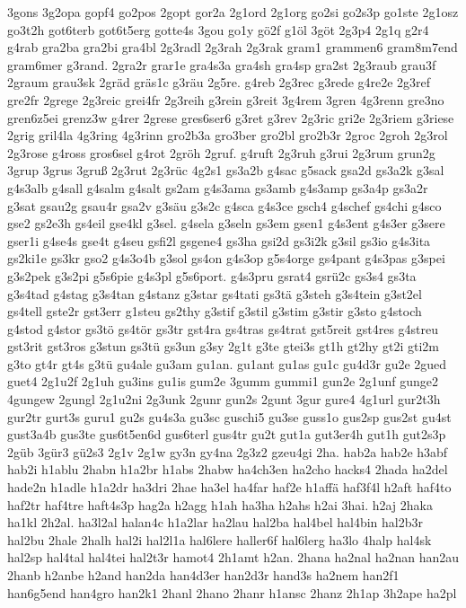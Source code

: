 {3gons
3g2opa
gopf4
go2pos
2gopt
gor2a
2g1ord
2g1org
go2si
go2s3p
go1ste
2g1osz
go3t2h
got6terb
got6t5erg
gotte4s
3gou
go1y
gö2f
g1öl
3göt
2g3p4
2g1q
g2r4
g4rab
gra2ba
gra2bi
gra4bl
2g3radl
2g3rah
2g3rak
gram1
grammen6
gram8m7end
gram6mer
g3rand.
2gra2r
grar1e
gra4s3a
gra4sh
gra4sp
gra2st
2g3raub
grau3f
2graum
grau3sk
2gräd
gräs1c
g3räu
2g5re.
g4reb
2g3rec
g3rede
g4re2e
2g3ref
gre2fr
2grege
2g3reic
grei4fr
2g3reih
g3rein
g3reit
3g4rem
3gren
4g3renn
gre3no
gren6z5ei
grenz3w
g4rer
2grese
gres6ser6
g3ret
g3rev
2g3ric
gri2e
2g3riem
g3riese
2grig
gril4la
4g3ring
4g3rinn
gro2b3a
gro3ber
gro2bl
gro2b3r
2groc
2groh
2g3rol
2g3rose
g4ross
gros6sel
g4rot
2gröh
2gruf.
g4ruft
2g3ruh
g3rui
2g3rum
grun2g
3grup
3grus
3gruß
2g3rut
2g3rüc
4g2s1
gs3a2b
g4sac
g5sack
gsa2d
gs3a2k
g3sal
g4s3alb
g4sall
g4salm
g4salt
gs2am
g4s3ama
gs3amb
g4s3amp
gs3a4p
gs3a2r
g3sat
gsau2g
gsau4r
gsa2v
g3säu
g3s2c
g4sca
g4s3ce
gsch4
g4schef
gs4chi
g4sco
gse2
gs2e3h
gs4eil
gse4kl
g3sel.
g4sela
g3seln
gs3em
gsen1
g4s3ent
g4s3er
g3sere
gser1i
g4se4s
gse4t
g4seu
gsfi2l
gsgene4
gs3ha
gsi2d
gs3i2k
g3sil
gs3io
g4s3ita
gs2ki1e
gs3kr
gso2
g4s3o4b
g3sol
gs4on
g4s3op
g5s4orge
gs4pant
g4s3pas
g3spei
g3s2pek
g3s2pi
g5s6pie
g4s3pl
g5s6port.
g4s3pru
gsrat4
gsrü2c
gs3s4
gs3ta
g3s4tad
g4stag
g3s4tan
g4stanz
g3star
gs4tati
gs3tä
g3steh
g3s4tein
g3st2el
gs4tell
gste2r
gst3err
g1steu
gs2thy
g3stif
g3stil
g3stim
g3stir
g3sto
g4stoch
g4stod
g4stor
gs3tö
gs4tör
gs3tr
gst4ra
gs4tras
gs4trat
gst5reit
gst4res
g4streu
gst3rit
gst3ros
g3stun
gs3tü
gs3un
g3sy
2g1t
g3te
gtei3s
gt1h
gt2hy
gt2i
gti2m
g3to
gt4r
gt4s
g3tü
gu4ale
gu3am
gu1an.
gu1ant
gu1as
gu1c
gu4d3r
gu2e
2gued
guet4
2g1u2f
2g1uh
gu3ins
gu1is
gum2e
3gumm
gummi1
gun2e
2g1unf
gunge2
4gungew
2gungl
2g1u2ni
2g3unk
2gunr
gun2s
2gunt
3gur
gure4
4g1url
gur2t3h
gur2tr
gurt3s
guru1
gu2s
gu4s3a
gu3sc
guschi5
gu3se
guss1o
gus2sp
gus2st
gu4st
gust3a4b
gus3te
gus6t5en6d
gus6terl
gus4tr
gu2t
gut1a
gut3er4h
gut1h
gut2s3p
2güb
3gür3
gü2s3
2g1v
2g1w
gy3n
gy4na
2g3z2
gzeu4gi
2ha.
hab2a
hab2e
h3abf
hab2i
h1ablu
2habn
h1a2br
h1abs
2habw
ha4ch3en
ha2cho
hacks4
2hada
ha2del
hade2n
h1adle
h1a2dr
ha3dri
2hae
ha3el
ha4far
haf2e
h1affä
haf3f4l
h2aft
haf4to
haf2tr
haf4tre
haft4s3p
hag2a
h2agg
h1ah
ha3ha
h2ahs
h2ai
3hai.
h2aj
2haka
ha1kl
2h2al.
ha3l2al
halan4c
h1a2lar
ha2lau
hal2ba
hal4bel
hal4bin
hal2b3r
hal2bu
2hale
2halh
hal2i
hal2l1a
hal6lere
haller6f
hal6lerg
ha3lo
4halp
hal4sk
hal2sp
hal4tal
hal4tei
hal2t3r
hamot4
2h1amt
h2an.
2hana
ha2nal
ha2nan
han2au
2hanb
h2anbe
h2and
han2da
han4d3er
han2d3r
hand3s
ha2nem
han2f1
han6g5end
han4gro
han2k1
2hanl
2hano
2hanr
h1ansc
2hanz
2h1ap
3h2ape
ha2pl
}
